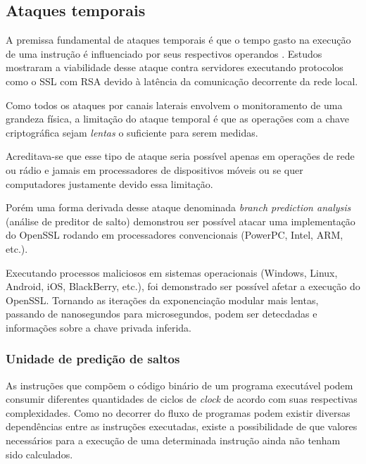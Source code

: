 \subsection{Ataques temporais}

A premissa fundamental de ataques temporais \'{e} que o tempo gasto na execu\c{c}\~{a}o de uma instru\c{c}\~{a}o \'{e} influenciado por seus respectivos operandos \cite{ECCBook_HankersonVanstone2004}. Estudos mostraram \cite{1251354} a viabilidade desse ataque contra servidores executando protocolos como o SSL com RSA devido à lat\^{e}ncia da comunica\c{c}\~{a}o decorrente da rede local.

Como todos os ataques por canais laterais envolvem o monitoramento de uma grandeza f\'{i}sica, a limita\c{c}\~{a}o do ataque temporal \'{e} que as opera\c{c}\~{o}es com a chave criptogr\'{a}fica sejam \textit{lentas} o suficiente para serem medidas.

Acreditava-se que esse tipo de ataque seria poss\'{i}vel apenas em opera\c{c}\~{o}es de rede ou r\'{a}dio e jamais em processadores de dispositivos m\'{o}veis ou se quer computadores justamente devido essa limita\c{c}\~{a}o.

Por\'{e}m uma forma derivada desse ataque denominada \textit{branch prediction analysis} (an\'{a}lise de preditor de salto) \cite{1266999} demonstrou ser poss\'{i}vel atacar uma implementa\c{c}\~{a}o do OpenSSL rodando em processadores convencionais (PowerPC, Intel, ARM, etc.).

Executando processos maliciosos em sistemas operacionais (Windows, Linux, Android, iOS, BlackBerry, etc.), foi demonstrado ser poss\'{i}vel afetar a execu\c{c}\~{a}o do OpenSSL. Tornando as itera\c{c}\~{o}es da exponencia\c{c}\~{a}o modular mais lentas, passando de nanosegundos para microsegundos, podem ser detecdadas e informações sobre a chave privada inferida.

\subsubsection{Unidade de predi\c{c}\~{a}o de saltos}

As instru\c{c}\~{o}es que comp\~{o}em o c\'{o}digo bin\'{a}rio de um programa execut\'{a}vel podem consumir diferentes quantidades de ciclos de \textit{clock} de acordo com suas respectivas complexidades. Como no decorrer do fluxo de programas podem existir diversas depend\^{e}ncias entre as instru\c{c}\~{o}es executadas, existe a possibilidade de que valores necess\'{a}rios para a execu\c{c}\~{a}o de uma determinada instru\c{c}\~{a}o ainda n\~{a}o tenham sido calculados.

